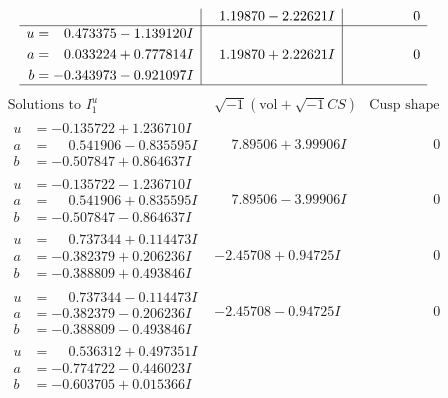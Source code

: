 \documentclass[1p]{elsarticle_modified}
\theoremstyle{definition}
\newcommand{\I}{\sqrt{-1}}
\begin{document}
$$\begin{array}{c|c|c}
 & \phantom{-}1.19870 - 2.22621 I & \phantom{-0.000000 } 0 \\ \hline\begin{aligned}
u &= \phantom{-}0.473375 - 1.139120 I \\
a &= \phantom{-}0.033224 + 0.777814 I \\
b &= -0.343973 - 0.921097 I\end{aligned}
 & \phantom{-}1.19870 + 2.22621 I & \phantom{-0.000000 } 0\\
 \hline 
 \end{array}$$\newpage$$\begin{array}{c|c|c}  
\text{Solutions to }I^u_{1}& \I (\text{vol} + \sqrt{-1}CS) & \text{Cusp shape}\\
 \hline 
\begin{aligned}
u &= -0.135722 + 1.236710 I \\
a &= \phantom{-}0.541906 - 0.835595 I \\
b &= -0.507847 + 0.864637 I\end{aligned}
 & \phantom{-}7.89506 + 3.99906 I & \phantom{-0.000000 } 0 \\ \hline\begin{aligned}
u &= -0.135722 - 1.236710 I \\
a &= \phantom{-}0.541906 + 0.835595 I \\
b &= -0.507847 - 0.864637 I\end{aligned}
 & \phantom{-}7.89506 - 3.99906 I & \phantom{-0.000000 } 0 \\ \hline\begin{aligned}
u &= \phantom{-}0.737344 + 0.114473 I \\
a &= -0.382379 + 0.206236 I \\
b &= -0.388809 + 0.493846 I\end{aligned}
 & -2.45708 + 0.94725 I & \phantom{-0.000000 } 0 \\ \hline\begin{aligned}
u &= \phantom{-}0.737344 - 0.114473 I \\
a &= -0.382379 - 0.206236 I \\
b &= -0.388809 - 0.493846 I\end{aligned}
 & -2.45708 - 0.94725 I & \phantom{-0.000000 } 0 \\ \hline\begin{aligned}
u &= \phantom{-}0.536312 + 0.497351 I \\
a &= -0.774722 - 0.446023 I \\
b &= -0.603705 + 0.015366 I\end{aligned}

\end{array}$$
\end{document}

